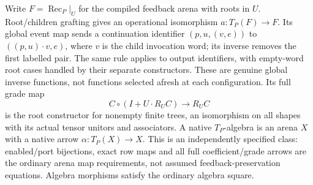 \documentclass[11pt]{article}
\begin{document}
Write $F=\operatorname{Rec}_P|_U$ for the compiled feedback arena with roots in $U$. Root/children grafting gives an operational isomorphism $a:T_P(F)\to F$. Its global event map sends a continuation identifier $(p,u,(v,e))$ to $((p,u)\cdot v,e)$, where $v$ is the child invocation word; its inverse removes the first labelled pair. The same rule applies to output identifiers, with empty-word root cases handled by their separate constructors. These are genuine global inverse functions, not functions selected afresh at each configuration. Its full grade map
\[
 C\circ(I+U\cdot R_UC)\longrightarrow R_UC
\]
is the root constructor for nonempty finite trees, an isomorphism on all shapes with its actual tensor unitors and associators. A native $T_P$-algebra is an arena $X$ with a native arrow $\alpha:T_P(X)\to X$. This is an independently specified class: enabled/port bijections, exact row maps and all full coefficient/grade arrows are the ordinary arena map requirements, not assumed feedback-preservation equations. Algebra morphisms satisfy the ordinary algebra square.
\end{document}
